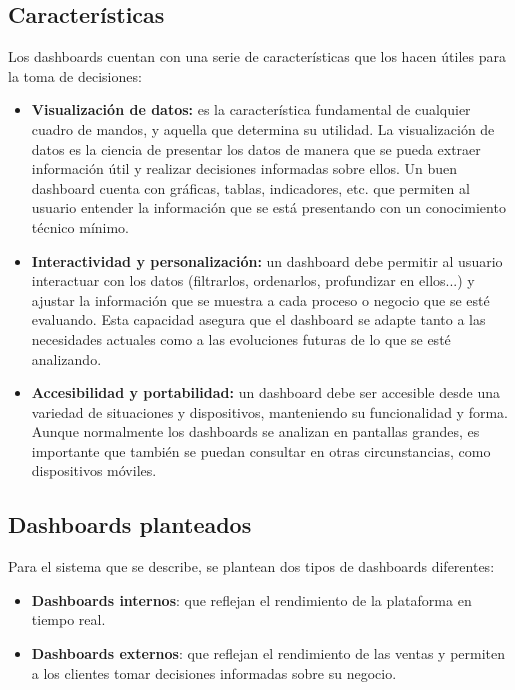 \subsection{Características}
Los dashboards cuentan con una serie de características que los hacen útiles para la toma de
decisiones:

\begin{itemize}
	\item \textbf{Visualización de datos:} es la característica fundamental de cualquier
		cuadro de mandos, y aquella que determina su utilidad. La visualización de datos
		es la ciencia de presentar los datos de manera que se pueda extraer información útil
		y realizar decisiones informadas sobre ellos. Un buen dashboard cuenta con gráficas,
		tablas, indicadores, etc. que permiten al usuario entender la información que se
		está presentando con un conocimiento técnico mínimo.
	\item \textbf{Interactividad y personalización:} un dashboard debe permitir al usuario
		interactuar con los datos (filtrarlos, ordenarlos, profundizar en ellos...) y ajustar
		la información que se muestra a cada proceso o negocio que se esté evaluando.
		Esta capacidad asegura que el dashboard se adapte tanto a las necesidades actuales
		como a las evoluciones futuras de lo que se esté analizando.
	\item \textbf{Accesibilidad y portabilidad:} un dashboard debe ser accesible desde una
		variedad de situaciones y dispositivos, manteniendo su funcionalidad y forma. Aunque
		normalmente los dashboards se analizan en pantallas grandes, es importante que también
		se puedan consultar en otras circunstancias, como dispositivos móviles.
\end{itemize}

\newpage{}
\subsection{Dashboards planteados}
Para el sistema que se describe, se plantean dos tipos de dashboards diferentes:

\begin{itemize}
	\item \textbf{Dashboards internos}: que reflejan el rendimiento de la plataforma en tiempo real.
	\item \textbf{Dashboards externos}: que reflejan el rendimiento de las ventas y permiten a los
	      clientes tomar decisiones informadas sobre su negocio.
\end{itemize}

